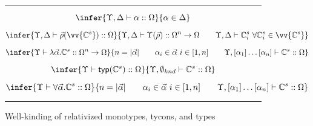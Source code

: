 
\begin{figure}
\hrule

\begin{equation}
\infer{\Upsilon, \Delta \vdash \alpha :: \Omega}
{\alpha \in \Delta}
\label{eq:r-k-var}
\end{equation}

\begin{equation}
\infer{\Upsilon, \Delta \vdash \vec{\rho}(\vv{\mathbb{C}^s}) :: \Omega}
{\Upsilon, \Delta \vdash \Upsilon(\vec{\rho}) :: \Omega^n \to \Omega\qquad
 \Upsilon, \Delta \vdash \mathbb{C}^s_i~\forall \mathbb{C}^s_i \in \vv{\mathbb{C}^s}}
\label{eq:r-k-app}
\end{equation}

\begin{equation}
\infer{\Upsilon \vdash \lambda\vec{\alpha}.\mathbb{C}^s 
:: \Omega^n \to \Omega}
{n=|\vec{\alpha}|\qquad\alpha_i\in\vec{\alpha}~i\in[1,n]\qquad
\Upsilon, [\alpha_1]\ldots[\alpha_n] \vdash \mathbb{C}^s :: \Omega}
\label{eq:r-k-abs}
\end{equation}

\begin{equation}
\infer{\Upsilon\vdash\mathsf{typ}(\mathbb{C}^s) :: \Omega}
{\Upsilon,\emptyset_{knd}\vdash \mathbb{C}^s :: \Omega}
\label{eq:r-k-typ}
\end{equation}

\begin{equation}
\infer{\Upsilon\vdash \forall\vec{\alpha}.\mathbb{C}^s :: \Omega}
{n=|\vec{\alpha}|\qquad\alpha_i\in\vec{\alpha}~i\in[1,n]\qquad \Upsilon,[\alpha_1]\ldots[\alpha_n]\vdash \mathbb{C}^s :: \Omega}
\label{eq:r-k-fa}
\end{equation}

\hrule 

\caption{Well-kinding of relativized monotypes, tycons, and types}
\label{fig:relativized-wellkinding}
\end{figure}


